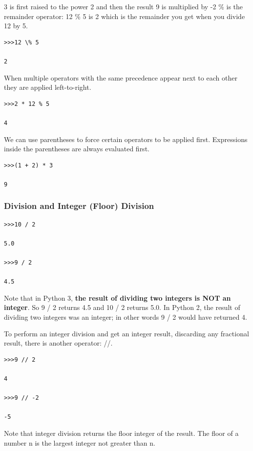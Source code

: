 \documentclass{article}
\begin{document}
3 is first raised to the power 2 and then the result 9 is multiplied by -2 
\% is the remainder operator:  12 \% 5 is 2 which is the remainder you get when you divide 12 by 5.

\begin{lstlisting}
>>>12 \% 5

2
\end{lstlisting}

When multiple operators with the same precedence appear next to each other they are applied left-to-right.

\begin{lstlisting}
>>>2 * 12 % 5

4
\end{lstlisting}

We can use parentheses to force certain operators to be applied first.  Expressions inside the parentheses are always evaluated first.

\begin{lstlisting}
>>>(1 + 2) * 3

9
\end{lstlisting}

\subsubsection{Division and Integer (Floor) Division}

\begin{lstlisting}
>>>10 / 2

5.0

>>>9 / 2

4.5
\end{lstlisting}

Note that in Python 3, \textbf{the result of dividing two integers is NOT an integer}.  So 9 / 2 returns 4.5 and 10 / 2 returns 5.0.  In Python 2, the result of dividing two integers was an integer; in other words 9 / 2 would have returned 4.

To perform an integer division and get an integer result, discarding any fractional result, there is another operator: //.
\begin{lstlisting}  
>>>9 // 2

4

>>>9 // -2

-5
\end{lstlisting}

Note that integer division returns the floor integer of the result.  The floor of a number n is the largest integer not greater than n.
\end{document}
